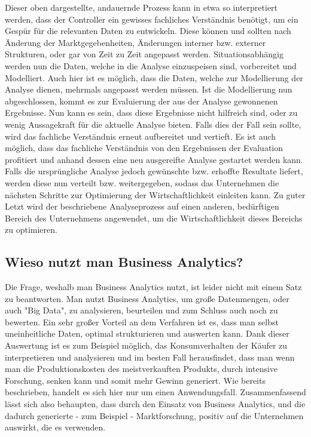 \documentclass[12pt,twocolumn,twoside]{conference}   %
\begin{document}
Dieser oben dargestellte, andauernde Prozess kann in etwa so interpretiert werden, dass der Controller ein gewisses fachliches Verständnis benötigt, um ein Gespür für die relevanten Daten zu entwickeln. Diese können und sollten nach Änderung der Marktgegebenheiten, Änderungen interner bzw. externer Strukturen, oder gar von Zeit zu Zeit angepasst werden. Situationsabhängig werden nun die Daten, welche in die Analyse einzuspeisen sind, vorbereitet und Modelliert. Auch hier ist es möglich, dass die Daten, welche zur Modellierung der Analyse dienen, mehrmals angepasst werden müssen. Ist die Modellierung nun abgeschlossen, kommt es zur Evaluierung der aus der Analyse gewonnenen Ergebnisse. Nun kann es sein, dass diese Ergebnisse nicht hilfreich sind, oder zu wenig Aussagekraft für die aktuelle Analyse bieten. Falls dies der Fall sein sollte, wird das fachliche Verständnis erneut aufbereitet und vertieft. Es ist auch möglich, dass das fachliche Verständnis von den Ergebnissen der Evaluation profitiert und anhand dessen eine neu ausgereifte Analyse gestartet werden kann. Falls die ursprüngliche Analyse jedoch gewünschte bzw. erhoffte Resultate liefert, werden diese nun verteilt bzw. weitergegeben, sodass das Unternehmen die nächsten Schritte zur Optimierung der Wirtschaftlichkeit einleiten kann. Zu guter Letzt wird der beschriebene Analyseprozess auf einen anderen, bedürftigen Bereich des Unternehmens angewendet, um die Wirtschaftlichkeit dieses Bereichs zu optimieren.

\subsection{Wieso nutzt man Business Analytics?}
Die Frage, weshalb man Business Analytics nutzt, ist leider nicht mit einem Satz zu beantworten. Man nutzt Business Analytics, um große Datenmengen, oder auch "Big Data", zu analysieren, beurteilen und zum Schluss auch noch zu bewerten. Ein sehr großer Vorteil an dem Verfahren ist es, dass man selbst uneinheitliche Daten, optimal strukturieren und auswerten kann. Dank dieser Auswertung ist es zum Beispiel möglich, das Konsumverhalten der Käufer zu interpretieren und analysieren und im besten Fall herausfindet, dass man wenn man die Produktionskosten des meistverkauften Produkts, durch intensive Forschung, senken kann und somit mehr Gewinn generiert. Wie bereits beschrieben, handelt es sich hier nur um einen Anwendungsfall. Zusammenfassend lässt sich also behaupten, dass durch den Einsatz von Business Analytics, und die dadurch generierte - zum Beispiel - Marktforschung, positiv auf die Unternehmen auswirkt, die es verwenden.
\end{document}
